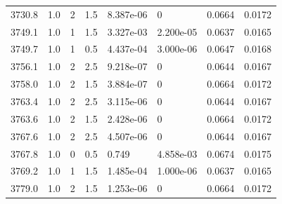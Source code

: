 \documentclass[preview]{standalone}
\begin{document}
{{{{{{{{{{{{{\begin{tabular}{L{1.2cm}C{1.2cm} C{0.3cm}C{0.5cm} C{1.4cm}C{1.4cm} C{1.4cm}C{1.4cm}}
  3730.8  &   1.0  & 2     & 1.5 &  8.387e-06  & 0  & 0.0664 &  0.0172   \\ 
  3749.1  &   1.0  & 1     & 1.5 &  3.327e-03  & 2.200e-05  & 0.0637 &  0.0165   \\ 
  3749.7  &   1.0  & 1     & 0.5 &  4.437e-04  & 3.000e-06  & 0.0647 &  0.0168   \\ 
  3756.1  &   1.0  & 2     & 2.5 &  9.218e-07  & 0  & 0.0644 &  0.0167   \\ 
  3758.0  &   1.0  & 2     & 1.5 &  3.884e-07  & 0  & 0.0664 &  0.0172   \\ 
  3763.4  &   1.0  & 2     & 2.5 &  3.115e-06  & 0  & 0.0644 &  0.0167   \\ 
  3763.6  &   1.0  & 2     & 1.5 &  2.428e-06  & 0  & 0.0664 &  0.0172   \\ 
  3767.6  &   1.0  & 2     & 2.5 &  4.507e-06  & 0  & 0.0644 &  0.0167   \\ 
  3767.8  &   1.0  & 0     & 0.5 &  0.749  & 4.858e-03  & 0.0674 &  0.0175   \\ 
  3769.2  &   1.0  & 1     & 1.5 &  1.485e-04  & 1.000e-06  & 0.0637 &  0.0165   \\ 
  3779.0  &   1.0  & 2     & 1.5 &  1.253e-06  & 0  & 0.0664 &  0.0172   \\ 
\hline 
\end{tabular} 

}}}}}}}}}}}}}
\end{document}

